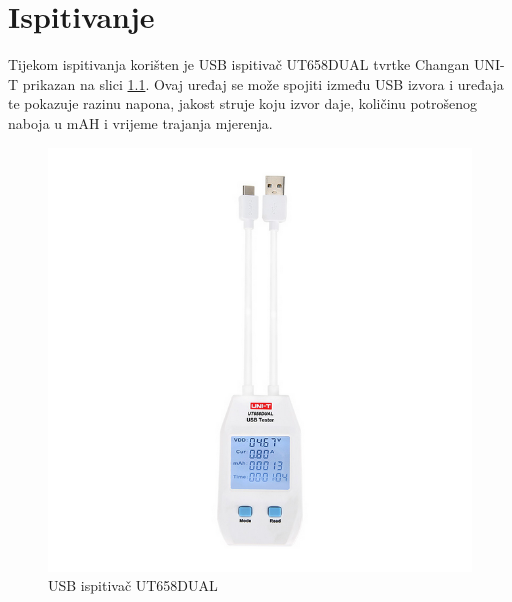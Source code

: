 \chapter{Ispitivanje}
Tijekom ispitivanja korišten je USB ispitivač UT658DUAL tvrtke Changan UNI-T prikazan na slici \ref{slk:UT658DUAL}. Ovaj uređaj se može spojiti između USB izvora i uređaja te pokazuje razinu napona, jakost struje koju izvor daje, količinu potrošenog naboja u mAH i vrijeme trajanja mjerenja.
\begin{figure}[htb]
    \centering
    \includegraphics[width=6 cm]{Figures/UT658DUAL.png}
    \caption{USB ispitivač UT658DUAL}
    \label{slk:UT658DUAL}
\end{figure}
